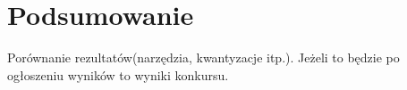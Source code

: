 \chapter{Podsumowanie}
\label{cha:Podsumowanie}

Porównanie rezultatów(narzędzia, kwantyzacje itp.).
Jeżeli to będzie po ogłoszeniu wyników to wyniki konkursu.

